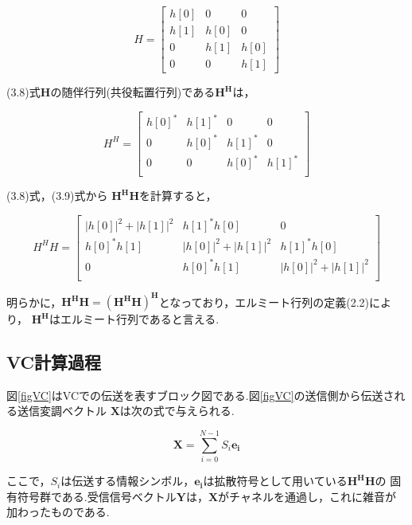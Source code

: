 \begin{equation}
    H = \left[
        \begin{array}{ccc}
            h[0] & 0 & 0 \\
            h[1] & h[0] & 0 \\
            0 & h[1] & h[0] \\
            0 & 0 & h[1]
        \end{array}
    \right]
\end{equation}

(3.8)式$\bm{H}$の随伴行列(共役転置行列)である$\bm{H^H}$は，

\begin{equation}
    H^H = \left[
        \begin{array}{cccc}
            h[0]^* & h[1]^* & 0 & 0 \\
            0 & h[0]^* & h[1]^* & 0 \\
            0 & 0 & h[0]^* & h[1]^* \\
        \end{array}
    \right]
\end{equation}

(3.8)式，(3.9)式から $\bm{H^HH}$を計算すると，

\begin{equation}
    H^HH = \left[
        \begin{array}{ccc}
            |h[0]|^2+|h[1]|^2 & h[1]^*h[0] & 0 \\
            h[0]^*h[1] & |h[0]|^2+|h[1]|^2 & h[1]^*h[0] \\
            0 & h[0]^*h[1] & |h[0]|^2+|h[1]|^2 \\
        \end{array}
    \right]
\end{equation}

明らかに，$\bm{H^HH=(H^HH)^H}$となっており，エルミート行列の定義(2.2)により，
$\bm{H^H}$はエルミート行列であると言える.

\subsection{VC計算過程}
図\ref{figVC}はVCでの伝送を表すブロック図である.図\ref{figVC}の送信側から伝送される送信変調ベクトル
$\bm{X}$は次の式で与えられる.

\begin{equation}
    \bm{X} = \sum_{i=0}^{N-1} S_i\bm{e_i}
\end{equation}

ここで，$S_i$は伝送する情報シンボル，$\bm{e_i}$は拡散符号として用いている$\bm{H^HH}$の
固有符号群である.受信信号ベクトル$\bm{Y}$は，$\bm{X}$がチャネルを通過し，これに雑音が
加わったものである.

